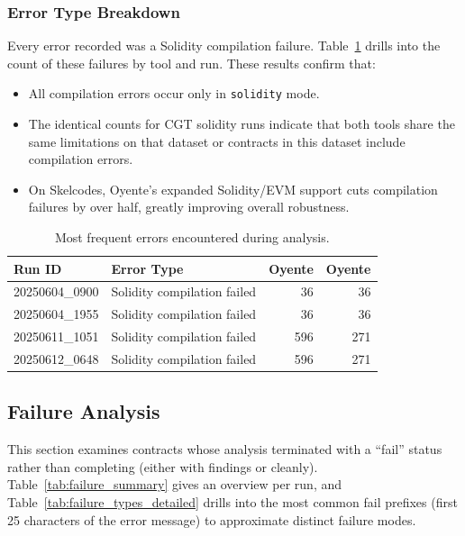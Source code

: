 \documentclass{article}
\newcommand\OY{Oyente}
\newcommand\OYp{\OY\raisebox{0.3ex}{\smaller +}}
\newcommand\CGTsscA{20250604\_0900}%
\newcommand\CGTsscB{20250604\_1955}%
\newcommand\SKCsscA{20250611\_1051}%
\newcommand\SKCsscB{20250612\_0648}%
\begin{document}
	\subsubsection{Error Type Breakdown}
	Every error recorded was a Solidity compilation failure. Table~\ref{tab:error_types} drills into the count of these failures by tool and run.	These results confirm that:
	\begin{itemize}
		\item All compilation errors occur only in \texttt{solidity} mode.
		\item The identical counts for CGT solidity runs indicate that both tools share the same limitations on that dataset or contracts in this dataset include compilation errors.
		\item On Skelcodes, \OYp’s expanded Solidity/EVM support cuts compilation failures by over half, greatly improving overall robustness.
	\end{itemize}

	\begin{table}[ht]
		\centering
		\begin{tabular}{llrr}
			\toprule
			\textbf{Run ID} & \textbf{Error Type} & \textbf{\OY} & \textbf{\OYp} \\
			\midrule
			\CGTsscA & Solidity compilation failed & 36 & 36  \\
			\CGTsscB & Solidity compilation failed & 36 & 36  \\
			\SKCsscA & Solidity compilation failed & 596 & 271 \\
			\SKCsscB & Solidity compilation failed & 596 & 271 \\
			\bottomrule
		\end{tabular}
		\caption{Most frequent errors encountered during analysis.}
		\label{tab:error_types}
	\end{table}

	\subsection{Failure Analysis}
	This section examines contracts whose analysis terminated with a “fail” status rather than completing (either with findings or cleanly). Table~\ref{tab:failure_summary} gives an overview per run, and Table~\ref{tab:failure_types_detailed} drills into the most common fail prefixes (first 25 characters of the error message) to approximate distinct failure modes.
\end{document}
